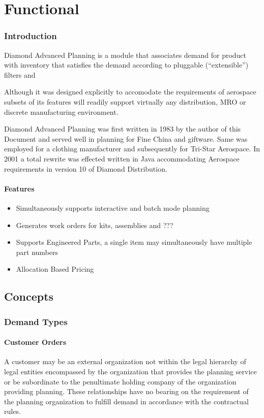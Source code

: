 \part{Functional}
\section{Introduction}
Diamond Advanced Planning is a module that associates demand for product with
inventory that satisfies the demand according to pluggable (``extensible'') filters and 

Although it was designed explicitly to accomodate the requirements of aerospace
subsets of its 
features will readily support virtually any distribution, MRO or discrete
manufacturing environment.

Diamond Advanced Planning was first written in 1983 by the author of this Document and served well in 
planning for Fine China and giftware.  Same was employed for a clothing manufacturer and subsequently 
for Tri-Star Aerospace.   In 2001 a total rewrite was effected written in Java accommodating Aerospace 
requirements in version 10 of Diamond Distribution.   

\subsection{Features}
\begin{itemize}
 \item Simultaneously supports interactive and batch mode planning
 \item Generates work orders for kits, assemblies and ???
 \item Supports Engineered Parts, a single item may simultaneously have multiple part numbers
 \item Allocation Based Pricing
\end{itemize}

\chapter{Concepts}

\section{Demand Types}
\subsection{Customer Orders}
A customer may be an external organization not within the legal hierarchy of legal entities 
encompassed by the organization that provides the planning service or be subordinate to the penultimate
holding company of the organization providing planning. These relationships have no bearing on the requirement
of the planning organization to fulfill demand in accordance with the contractual rules.

